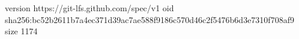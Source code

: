 version https://git-lfs.github.com/spec/v1
oid sha256:bc52b2611b7a4ec371d39ac7ae588f9186c570d46c2f5476b6d3e7310f708af9
size 1174
